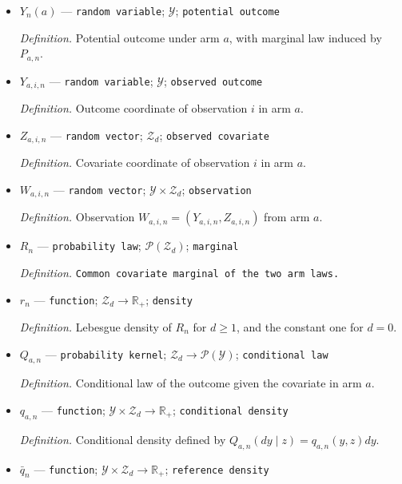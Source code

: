 \documentclass{article}
\begin{document}
\begin{itemize}
  \par\smallskip\noindent\emph{Definition.} Law of the observed outcome and covariate in arm \(a\) at index \(n\).
  \item \(Y_n(a)\) --- \texttt{random variable}; \(\mathcal Y\); \texttt{potential outcome}
  \par\smallskip\noindent\emph{Definition.} Potential outcome under arm \(a\), with marginal law induced by \(P_{a,n}\).
  \item \(Y_{a,i,n}\) --- \texttt{random variable}; \(\mathcal Y\); \texttt{observed outcome}
  \par\smallskip\noindent\emph{Definition.} Outcome coordinate of observation \(i\) in arm \(a\).
  \item \(Z_{a,i,n}\) --- \texttt{random vector}; \(\mathcal Z_d\); \texttt{observed covariate}
  \par\smallskip\noindent\emph{Definition.} Covariate coordinate of observation \(i\) in arm \(a\).
  \item \(W_{a,i,n}\) --- \texttt{random vector}; \(\mathcal Y\times\mathcal Z_d\); \texttt{observation}
  \par\smallskip\noindent\emph{Definition.} Observation \(W_{a,i,n}=(Y_{a,i,n},Z_{a,i,n})\) from arm \(a\).
  \item \(R_n\) --- \texttt{probability law}; \(\mathcal P(\mathcal Z_d)\); \texttt{marginal}
  \par\smallskip\noindent\emph{Definition.} \texttt{Common covariate marginal of the two arm laws.}
  \item \(r_n\) --- \texttt{function}; \(\mathcal Z_d\to\mathbb R_+\); \texttt{density}
  \par\smallskip\noindent\emph{Definition.} Lebesgue density of \(R_n\) for \(d\ge1\), and the constant one for \(d=0\).
  \item \(Q_{a,n}\) --- \texttt{probability kernel}; \(\mathcal Z_d\to\mathcal P(\mathcal Y)\); \texttt{conditional law}
  \par\smallskip\noindent\emph{Definition.} Conditional law of the outcome given the covariate in arm \(a\).
  \item \(q_{a,n}\) --- \texttt{function}; \(\mathcal Y\times\mathcal Z_d\to\mathbb R_+\); \texttt{conditional density}
  \par\smallskip\noindent\emph{Definition.} Conditional density defined by \(Q_{a,n}(dy\mid z)=q_{a,n}(y,z)dy\).
  \item \(\bar q_n\) --- \texttt{function}; \(\mathcal Y\times\mathcal Z_d\to\mathbb R_+\); \texttt{reference density}

\end{itemize}
\end{document}
